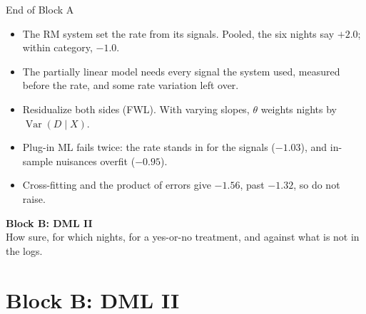 \documentclass[aspectratio=169, 11pt, handout]{beamer}
\newcommand{\Var}{\operatorname{Var}}
\begin{document}
\begin{frame}{End of Block A}

\begin{itemize}
  \item The RM system set the rate from its signals. Pooled, the six nights say $+2.0$; within category, $-1.0$.
  \item The partially linear model needs every signal the system used, measured before the rate, and some rate variation left over.
  \item Residualize both sides (FWL). With varying slopes, $\theta$ weights nights by $\Var(D \mid X)$.
  \item Plug-in ML fails twice: the rate stands in for the signals ($-1.03$), and in-sample nuisances overfit ($-0.95$).
  \item Cross-fitting and the product of errors give $-1.56$, past $-1.32$, so do not raise.
\end{itemize}

\vfill

\begin{center}
\Large \textbf{Block B: DML II}\\[0.4em]
\normalsize How sure, for which nights, for a yes-or-no treatment, and against what is not in the logs.
\end{center}
\vfill
\end{frame}

\section{Block B: DML II}
\end{document}
